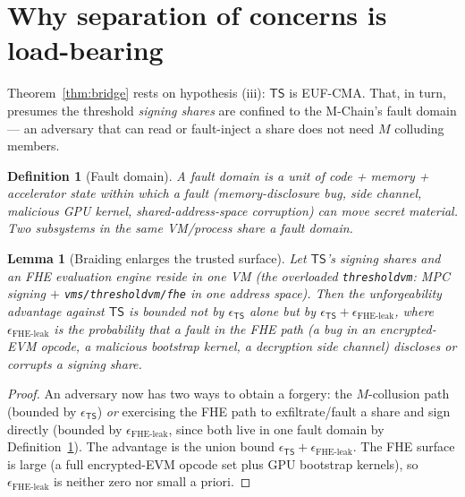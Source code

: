 \documentclass[11pt]{article}
\newtheorem{lemma}[theorem]{Lemma}
\newtheorem{definition}[theorem]{Definition}
\begin{document}
\section{Why separation of concerns is load-bearing}
\label{sec:separation}

Theorem~\ref{thm:bridge} rests on hypothesis (iii): $\mathsf{TS}$ is
EUF-CMA. That, in turn, presumes the threshold \emph{signing shares} are
confined to the M-Chain's fault domain --- an adversary that can read or
fault-inject a share does not need $M$ colluding members.

\begin{definition}[Fault domain]
\label{def:fault-domain}
A \emph{fault domain} is a unit of code + memory + accelerator state
within which a fault (memory-disclosure bug, side channel, malicious
GPU kernel, shared-address-space corruption) can move secret material.
Two subsystems in the same VM/process share a fault domain.
\end{definition}

\begin{lemma}[Braiding enlarges the trusted surface]
\label{lem:braid}
Let $\mathsf{TS}$'s signing shares and an FHE evaluation engine reside
in one VM (the overloaded \texttt{thresholdvm}: MPC signing $+$
\texttt{vms/thresholdvm/fhe} in one address space). Then the
unforgeability advantage against $\mathsf{TS}$ is bounded not by
$\epsilon_{\mathsf{TS}}$ alone but by
$\epsilon_{\mathsf{TS}} + \epsilon_{\mathrm{FHE\text{-}leak}}$, where
$\epsilon_{\mathrm{FHE\text{-}leak}}$ is the probability that a fault in
the FHE path (a bug in an encrypted-EVM opcode, a malicious bootstrap
kernel, a decryption side channel) discloses or corrupts a signing
share.
\end{lemma}
\begin{proof}
An adversary now has two ways to obtain a forgery: the $M$-collusion
path (bounded by $\epsilon_{\mathsf{TS}}$) \emph{or} exercising the FHE
path to exfiltrate/fault a share and sign directly (bounded by
$\epsilon_{\mathrm{FHE\text{-}leak}}$, since both live in one fault
domain by Definition~\ref{def:fault-domain}). The advantage is the
union bound $\epsilon_{\mathsf{TS}} + \epsilon_{\mathrm{FHE\text{-}leak}}$.
The FHE surface is large (a full encrypted-EVM opcode set plus GPU
bootstrap kernels), so $\epsilon_{\mathrm{FHE\text{-}leak}}$ is neither
zero nor small a priori.
\end{proof}
\end{document}
